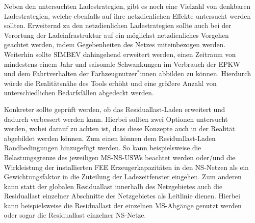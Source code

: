 Neben den untersuchten Ladestrategien, gibt es noch eine Vielzahl von denkbaren Ladestrategien, welche ebenfalls auf ihre netzdienlichen Effekte untersucht werden sollten.
Erweiternd zu den netzdienlichen Ladestrategien sollte auch bei der Verortung der Ladeinfrastruktur auf ein möglichst netzdienliches Vorgehen geachtet werden, indem Gegebenheiten des Netzes miteinbezogen werden.
Weiterhin sollte \gls{SIMBEV} dahingehend erweitert werden, einen Zeitraum von mindestens einem Jahr und saisonale Schwankungen im Verbrauch der \gls{EPKW} und dem Fahrtverhalten der Farhzeugnutzer\(^*\)innen abbilden zu können.
Hierdurch würde die Realitätsnähe des Tools erhöht und eine größere Anzahl von unterschiedlichen Bedarfsfällen abgedeckt werden.\medskip

Konkreter sollte geprüft werden, ob das Residuallast-Laden erweitert und dadurch verbessert werden kann.
Hierbei sollten zwei Optionen untersucht werden, wobei darauf zu achten ist, dass diese Konzepte auch in der Realität abgebildet werden können.
Zum einen können dem Residuallast-Laden Randbedingungen hinzugefügt werden.
So kann beispielsweise die Belastungsgrenze des jeweiligen \gls{MS}-\gls{NS}-\glspl{USW} beachtet werden oder/und die Wirkleistung der installierten \gls{FEE} Erzeugerkapazitäten in den \gls{NS}-Netzen als ein Gewichtungsfaktor in die Zuteilung der Ladezeitfenster eingehen.
Zum anderen kann statt der globalen Residuallast innerhalb des Netzgebietes auch die Residuallast einzelner Abschnitte des Netzgebietes als Leitlinie dienen.
Hierbei kann beispielsweise die Residuallast der einzelnen \gls{MS}-Abgänge genutzt werden oder sogar die Residuallast einzelner \gls{NS}-Netze.


